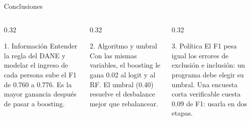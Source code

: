 \documentclass[aspectratio=169, 10pt]{beamer}
\begin{document}
\begin{frame}{Conclusiones}
\begin{columns}[T]
\begin{column}{0.32\textwidth}
\begin{block}{1. Información}
Entender la regla del DANE y modelar el ingreso de \alert{cada persona} sube el F1 de 0.760 a 0.776. Es la mayor ganancia después de pasar a boosting.
\end{block}
\end{column}
\begin{column}{0.32\textwidth}
\begin{block}{2. Algoritmo y umbral}
Con las mismas variables, el boosting le gana 0.02 al logit y al RF. El \alert{umbral} (0.40) resuelve el desbalance mejor que rebalancear.
\end{block}
\end{column}
\begin{column}{0.32\textwidth}
\begin{block}{3. Política}
El F1 pesa igual los errores de exclusión e inclusión: un programa debe \alert{elegir su umbral}. Una encuesta corta verificable cuesta 0.09 de F1: usarla en dos etapas.
\end{block}
\end{column}
\end{columns}
\vspace{1.2em}
\begin{center}
\hspace{2em}\hspace{2em}
\end{center}
\end{frame}
\end{document}
